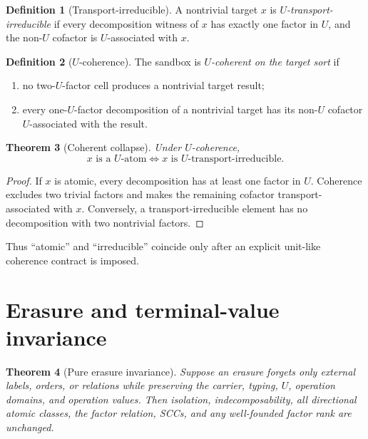 \documentclass[11pt]{article}
\newtheorem{theorem}{Theorem}[section]
\theoremstyle{definition}
\newtheorem{definition}[theorem]{Definition}
\theoremstyle{remark}
\begin{document}
\begin{definition}[Transport-irreducible]
A nontrivial target \(x\) is \emph{\(U\)-transport-irreducible} if every decomposition witness of \(x\) has exactly one factor in \(U\), and the non-\(U\) cofactor is \(U\)-associated with \(x\).
\end{definition}

\begin{definition}[\(U\)-coherence]
The sandbox is \emph{\(U\)-coherent on the target sort} if
\begin{enumerate}[label=(\roman*)]
\item no two-\(U\)-factor cell produces a nontrivial target result;
\item every one-\(U\)-factor decomposition of a nontrivial target has its non-\(U\) cofactor \(U\)-associated with the result.
\end{enumerate}
\end{definition}

\begin{theorem}[Coherent collapse]
Under \(U\)-coherence,
\begin{equation}
\boxed{x\text{ is a }U\text{-atom}\iff x\text{ is }U\text{-transport-irreducible}.}
\label{eq:irreducible}
\end{equation}
\end{theorem}

\begin{proof}
If \(x\) is atomic, every decomposition has at least one factor in \(U\). Coherence excludes two trivial factors and makes the remaining cofactor transport-associated with \(x\). Conversely, a transport-irreducible element has no decomposition with two nontrivial factors.
\end{proof}

Thus ``atomic'' and ``irreducible'' coincide only after an explicit unit-like coherence contract is imposed.

\section{Erasure and terminal-value invariance}

\begin{theorem}[Pure erasure invariance]
Suppose an erasure forgets only external labels, orders, or relations while preserving the carrier, typing, \(U\), operation domains, and operation values. Then isolation, indecomposability, all directional atomic classes, the factor relation, SCCs, and any well-founded factor rank are unchanged.
\end{theorem}
\end{document}
